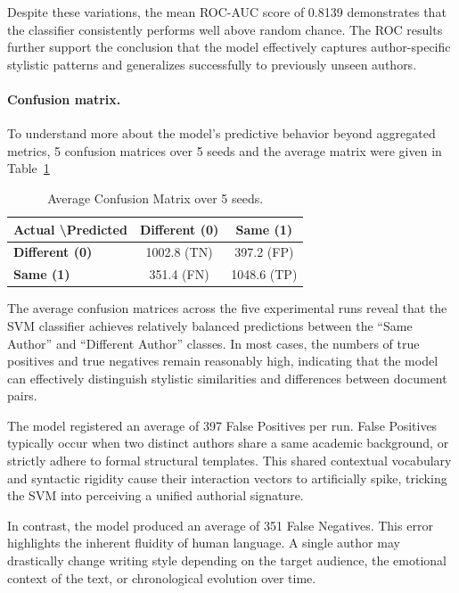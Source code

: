 \documentclass[11pt]{article}
\begin{document}
Despite these variations, the mean ROC-AUC score of 0.8139 demonstrates that the classifier consistently performs well above random chance. The ROC results further support the conclusion that the model effectively captures author-specific stylistic patterns and generalizes successfully to previously unseen authors.

\paragraph{Confusion matrix.}
To understand more about the model’s predictive behavior beyond aggregated metrics, 5 confusion matrices over 5 seeds and the average matrix were given in Table~\ref{tab:confmatrix}

\begin{table}[H]
  \centering
  \small
  \begin{tabular}{lcc}
    \toprule
    \textbf{Actual \textbackslash Predicted} & \textbf{Different (0)} & \textbf{Same (1)} \\
    \midrule
    \textbf{Different (0)} & 1002.8 (TN) & 397.2 (FP) \\
    \textbf{Same (1)} & 351.4 (FN) & 1048.6 (TP) \\
    \bottomrule
  \end{tabular}
  \caption{Average Confusion Matrix over 5 seeds.}
  \label{tab:confmatrix}
\end{table}

The average confusion matrices across the five experimental runs reveal that the SVM classifier achieves relatively balanced predictions between the “Same Author” and “Different Author” classes. In most cases, the numbers of true positives and true negatives remain reasonably high, indicating that the model can effectively distinguish stylistic similarities and differences between document pairs.

The model registered an average of 397 False Positives per run. False Positives typically occur when two distinct authors share a same academic background, or strictly adhere to formal structural templates. This shared contextual vocabulary and syntactic rigidity cause their interaction vectors to artificially spike, tricking the SVM into perceiving a unified authorial signature.

In contrast, the model produced an average of 351 False Negatives. This error highlights the inherent fluidity of human language. A single author may drastically change writing style depending on the target audience, the emotional context of the text, or chronological evolution over time. 
\end{document}
